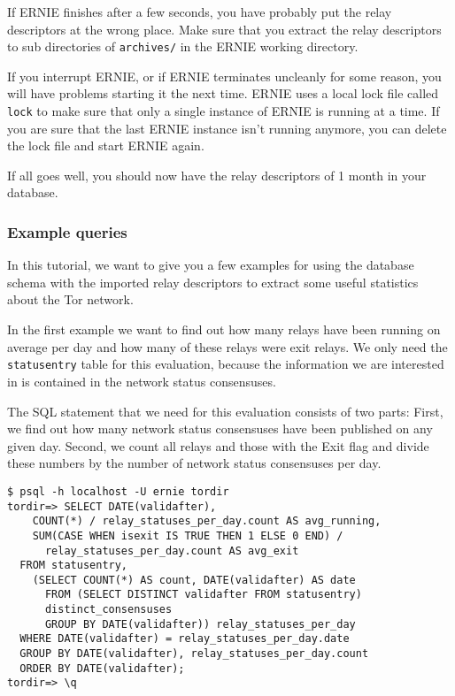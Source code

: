 \documentclass{article}
\begin{document}
If ERNIE finishes after a few seconds, you have probably put the relay
descriptors at the wrong place.
Make sure that you extract the relay descriptors to sub directories of
\verb+archives/+ in the ERNIE working directory.

If you interrupt ERNIE, or if ERNIE terminates uncleanly for some reason,
you will have problems starting it the next time.
ERNIE uses a local lock file called \verb+lock+ to make sure that only a
single instance of ERNIE is running at a time.
If you are sure that the last ERNIE instance isn't running anymore, you
can delete the lock file and start ERNIE again.

If all goes well, you should now have the relay descriptors of 1 month in
your database.

\subsubsection{Example queries}

In this tutorial, we want to give you a few examples for using the
database schema with the imported relay descriptors to extract some useful
statistics about the Tor network.

In the first example we want to find out how many relays have been running
on average per day and how many of these relays were exit relays.
We only need the \verb+statusentry+ table for this evaluation, because
the information we are interested in is contained in the network status
consensuses.

The SQL statement that we need for this evaluation consists of two parts:
First, we find out how many network status consensuses have been published
on any given day.
Second, we count all relays and those with the Exit flag and divide these
numbers by the number of network status consensuses per day.

\begin{verbatim}
$ psql -h localhost -U ernie tordir
tordir=> SELECT DATE(validafter),
    COUNT(*) / relay_statuses_per_day.count AS avg_running,
    SUM(CASE WHEN isexit IS TRUE THEN 1 ELSE 0 END) /
      relay_statuses_per_day.count AS avg_exit
  FROM statusentry,
    (SELECT COUNT(*) AS count, DATE(validafter) AS date
      FROM (SELECT DISTINCT validafter FROM statusentry)
      distinct_consensuses
      GROUP BY DATE(validafter)) relay_statuses_per_day
  WHERE DATE(validafter) = relay_statuses_per_day.date
  GROUP BY DATE(validafter), relay_statuses_per_day.count
  ORDER BY DATE(validafter);
tordir=> \q
\end{verbatim}
\end{document}
